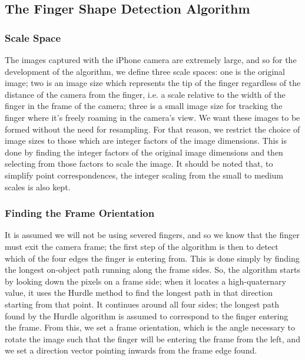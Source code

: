 \subsection{The Finger Shape Detection Algorithm}\label{sec:FingerShapeDetectionAlgorithm}

\subsubsection{Scale Space}\label{sec:ScaleSpace}
The images captured with the iPhone camera are extremely large, and so for the development of the algorithm, we define three scale spaces: one is the original image; two is an image size which represents the tip of the finger regardless of the distance of the camera from the finger, i.e. a scale relative to the width of the finger in the frame of the camera; three is a small image size for tracking the finger where it's freely roaming in the camera's view. We want these images to be formed without the need for resampling. For that reason, we restrict the choice of image sizes to those which are integer factors of the image dimensions. This is done by finding the integer factors of the original image dimensions and then selecting from those factors to scale the image. It should be noted that, to simplify point correspondences, the integer scaling from the small to medium scales is also kept.

\subsubsection{Finding the Frame Orientation}\label{sec:FindingTheFrameOrientation}
It is assumed we will not be using severed fingers, and so we know that the finger must exit the camera frame; the first step of the algorithm is then to detect which of the four edges the finger is entering from. This is done simply by finding the longest on-object path running along the frame sides. So, the algorithm starts by looking down the pixels on a frame side; when it locates a high-quaternary value, it uses the Hurdle method to find the longest path in that direction starting from that point. It continues around all four sides; the longest path found by the Hurdle algorithm is assumed to correspond to the finger entering the frame. From this, we set a frame orientation, which is the angle necessary to rotate the image such that the finger will be entering the frame from the left, and we set a direction vector pointing inwards from the frame edge found.

